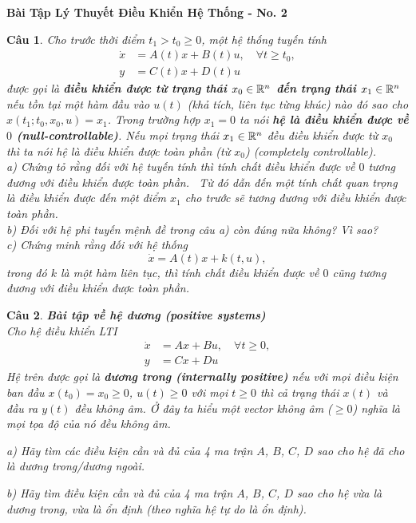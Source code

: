 \documentclass[11pt]{article}
\newtheorem{bt}{Câu}
\begin{document}



\begin{center}
	{\bf Bài Tập Lý Thuyết Điều Khiển Hệ Thống - No. 2}
\end{center}

\begin{bt}
Cho trước thời điểm $t_1 > t_0 \geq 0$, một hệ thống tuyến tính 
\begin{align}
	\dot{x} &= A(t)x + B(t)u, \quad \forall t \geq t_0, \\
	y &= C(t)x + D(t)u
\end{align}
được gọi là \textbf{điều khiển được từ trạng thái $x_0 \in \mathbb{R}^n$ đến trạng thái $x_1 \in \mathbb{R}^n$} nếu tồn tại một hàm đầu vào $u(t)$ (khả tích, liên tục từng khúc) nào đó sao cho $x(t_1;t_0,x_0,u) = x_1$. Trong trường hợp $x_1 = 0$ ta nói \textbf{hệ là điều khiển được về $0$ (null-controllable)}. 
Nếu mọi trạng thái $x_1 \in \mathbb{R}^n$ đều điều khiển được từ $x_0$ thì ta nói hệ là điều khiển được toàn phần (từ $x_0$) (completely controllable). \\ 
\noindent  a) Chứng tỏ rằng đối với hệ tuyến tính thì tính chất điều khiển được về $0$ tương đương với điều khiển được toàn phần. \ Từ đó dẫn đến một tính chất quan trọng là điều khiển được đến một điểm $x_1$ cho trước sẽ tương đương với điều khiển được toàn phần. \\
b) Đối với hệ phi tuyến mệnh đề trong câu a) còn đúng nữa không? Vì sao? \\
c) Chứng minh rằng đối với hệ thống 
\begin{equation}
	\dot{x} = A(t) x + k(t,u),
\end{equation}
trong đó $k$ là một hàm liên tục, thì tính chất điều khiển được về $0$ cũng tương đương với điều khiển được toàn phần. 
\end{bt}

\begin{bt} \textbf{Bài tập về hệ dương (positive systems)} \\
Cho hệ điều khiển LTI
\begin{align}
	\dot{x} &= Ax + Bu, \quad \forall t \geq 0, \\
	y &= Cx + Du
\end{align}
Hệ trên được gọi là \textbf{dương trong (internally positive)} nếu với mọi điều kiện ban đầu $x(t_0) = x_0 \geq 0$, $u(t) \geq 0$ với mọi $t\geq 0$ thì cả trạng thái $x(t)$ và đầu ra $y(t)$ đều không âm. Ở đây ta hiểu một vector không âm ($\geq 0$) nghĩa là mọi tọa độ của nó đều không âm. 

\noindent a) Hãy tìm các điều kiện cần và đủ của 4 ma trận $A$, $B$, $C$, $D$ sao cho hệ đã cho là dương trong/dương ngoài.

\noindent b) Hãy tìm điều kiện cần và đủ của 4 ma trận $A$, $B$, $C$, $D$ sao cho hệ vừa là dương trong, vừa là ổn định (theo nghĩa hệ tự do là ổn định).
\end{bt}   
\end{document}
